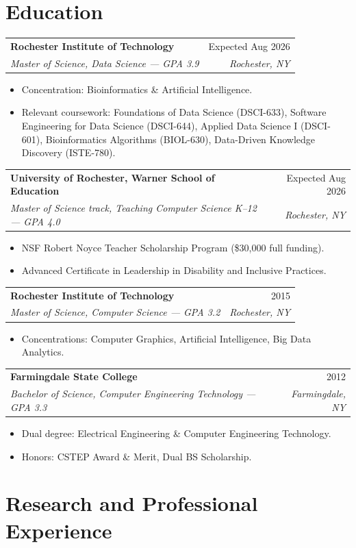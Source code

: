 \documentclass[11pt]{article}
\makeatletter
\newcommand{\entry}[4]{
  \noindent\begin{tabularx}{\textwidth}{@{}Xr@{}}
    \textbf{#1} & #2 \\
    \textit{#3} & \textit{#4}
  \end{tabularx}\vspace{2pt}
}
\makeatother
\begin{document}
\section{Education}

\entry{Rochester Institute of Technology}{Expected Aug 2026}{Master of Science, Data Science --- GPA 3.9}{Rochester, NY}
\begin{itemize}
  \item Concentration: Bioinformatics \& Artificial Intelligence.
  \item Relevant coursework: Foundations of Data Science (DSCI-633), Software Engineering for Data Science (DSCI-644), Applied Data Science I (DSCI-601), Bioinformatics Algorithms (BIOL-630), Data-Driven Knowledge Discovery (ISTE-780).
\end{itemize}

\entry{University of Rochester, Warner School of Education}{Expected Aug 2026}{Master of Science track, Teaching Computer Science K--12 --- GPA 4.0}{Rochester, NY}
\begin{itemize}
  \item NSF Robert Noyce Teacher Scholarship Program (\$30,000 full funding).
  \item Advanced Certificate in Leadership in Disability and Inclusive Practices.
\end{itemize}

\entry{Rochester Institute of Technology}{2015}{Master of Science, Computer Science --- GPA 3.2}{Rochester, NY}
\begin{itemize}
  \item Concentrations: Computer Graphics, Artificial Intelligence, Big Data Analytics.
\end{itemize}

\entry{Farmingdale State College}{2012}{Bachelor of Science, Computer Engineering Technology --- GPA 3.3}{Farmingdale, NY}
\begin{itemize}
  \item Dual degree: Electrical Engineering \& Computer Engineering Technology.
  \item Honors: CSTEP Award \& Merit, Dual BS Scholarship.
\end{itemize}

\section{Research and Professional Experience}
\end{document}
